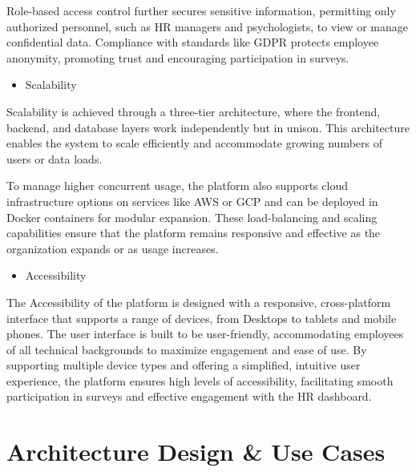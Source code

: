 \documentclass[conference]{IEEEtran}
\begin{document}
        Role-based access control further secures sensitive information, 
        permitting only authorized personnel, such as HR managers and 
        psychologists, to view or manage confidential data. Compliance with
        standards like GDPR protects employee anonymity, promoting trust 
        and encouraging participation in surveys.
        \newline    

        \begin{itemize}
            \item Scalability
        \end{itemize}
    
        Scalability is achieved through a three-tier architecture, where the 
        frontend, backend, and database layers work independently but in 
        unison. This architecture enables the system to scale efficiently 
        and accommodate growing numbers of users or data loads. 
        \newline
    
        To manage higher concurrent usage, the platform also supports cloud 
        infrastructure options on services like AWS or GCP and can be 
        deployed in Docker containers for modular expansion. These 
        load-balancing and scaling capabilities ensure that the platform 
        remains responsive and effective as the organization expands or as 
        usage increases.
        \newline    

        \begin{itemize}
            \item Accessibility
        \end{itemize}

        The Accessibility of the platform is designed with a responsive, 
        cross-platform interface that supports a range of devices, from 
        Desktops to tablets and mobile phones. The user interface is built 
        to be user-friendly, accommodating employees of all technical 
        backgrounds to maximize engagement and ease of use. By supporting 
        multiple device types and offering a simplified, intuitive user 
        experience, the platform ensures high levels of accessibility, 
        facilitating smooth participation in surveys and effective 
        engagement with the HR dashboard. 
        \newline 

    \section{Architecture Design \& Use Cases}
\end{document}
